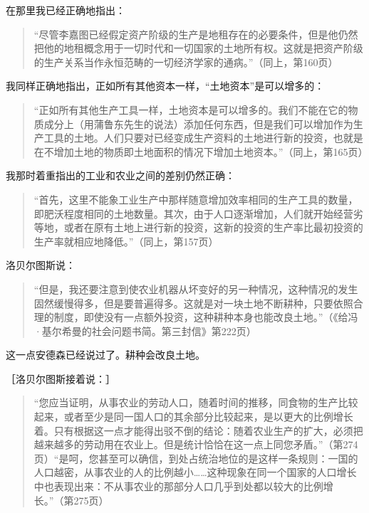在那里我已经正确地指出：

\begin{quote}{“尽管李嘉图已经假定资产阶级的生产是地租存在的必要条件，但是他仍然把他的地租概念用于一切时代和一切国家的土地所有权。这就是把资产阶级的生产关系当作永恒范畴的一切经济学家的通病。”（同上，第160页）}\end{quote}

我同样正确地指出，正如所有其他资本一样，“土地资本”是可以增多的：

\begin{quote}{“正如所有其他生产工具一样，土地资本是可以增多的。我们不能在它的物质成分上（用蒲鲁东先生的说法）添加任何东西，但是我们可以增加作为生产工具的土地。人们只要对已经变成生产资料的土地进行新的投资，也就是在不增加土地的物质即土地面积的情况下增加土地资本。”（同上，第165页）}\end{quote}

我那时着重指出的工业和农业之间的差别仍然正确：

\begin{quote}{“首先，这里不能象工业生产中那样随意增加效率相同的生产工具的数量，即肥沃程度相同的土地数量。其次，由于人口逐渐增加，人们就开始经营劣等地，或者在原有土地上进行新的投资，这新的投资的生产率比最初投资的生产率就相应地降低。”（同上，第157页）}\end{quote}

洛贝尔图斯说：

\begin{quote}{“但是，我还要注意到使农业机器从坏变好的另一种情况，这种情况的发生固然缓慢得多，但是要普遍得多。这就是对一块土地不断耕种，只要依照合理的制度，即使没有一点额外投资，这种耕种本身也能改良土地。”（《给冯·基尔希曼的社会问题书简。第三封信》第222页）}\end{quote}

这一点安德森已经说过了。耕种会改良土地。

［洛贝尔图斯接着说：］

\begin{quote}{“您应当证明，从事农业的劳动人口，随着时间的推移，同食物的生产比较起来，或者至少是同一国人口的其余部分比较起来，是以更大的比例增长着。只有根据这一点才能得出驳不倒的结论：随着农业生产的扩大，必须把越来越多的劳动用在农业上。但是统计恰恰在这一点上同您矛盾。”（第274页）“是呵，您甚至可以确信，到处占统治地位的是这样一条规则：一国的人口越密，从事农业的人的比例越小……这种现象在同一个国家的人口增长中也表现出来：不从事农业的那部分人口几乎到处都以较大的比例增长。”（第275页）}\end{quote}

